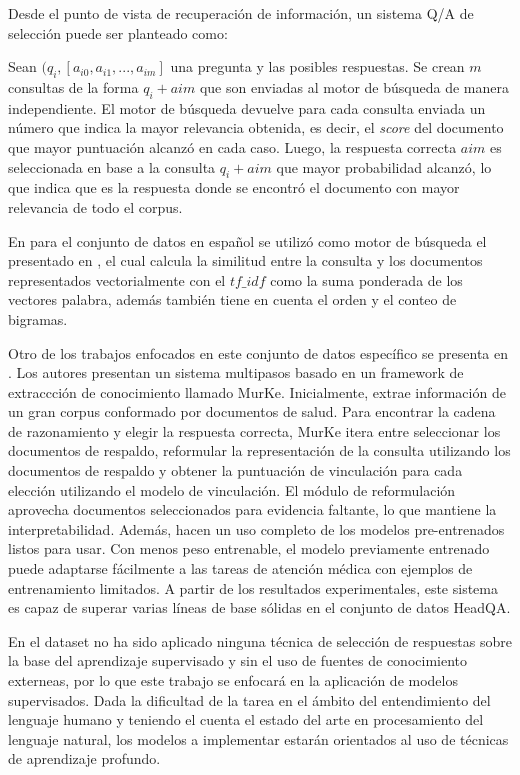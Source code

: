 Desde el punto de vista de recuperación de información, un sistema Q/A de selección puede ser planteado como: 

Sean $(q_{i}, [a_{i0}, a_{i1}, ..., a_{im}]$ una pregunta y las posibles respuestas. Se crean $m$ consultas de la forma $q_{i} + a{i}{m}$ que son enviadas al motor de búsqueda de manera independiente. El motor de búsqueda devuelve para cada consulta enviada un número que indica la mayor relevancia obtenida, es decir, el \textit{score} del documento que mayor puntuación alcanzó en cada caso. Luego, la respuesta correcta $a{i}{m}$ es seleccionada en base a la consulta $q_{i} + a{i}{m}$ que mayor probabilidad alcanzó, lo que indica que es la respuesta donde se encontró el documento con mayor relevancia de todo el corpus. 

En \cite{2019-head-qa} para el conjunto de datos en español se utilizó como motor de búsqueda el presentado en \cite{2017-chen-wikipedia}, el cual calcula la similitud entre la consulta y los documentos representados vectorialmente con el $tf\_idf$ como la suma ponderada de los vectores palabra, además también tiene en cuenta el orden y el conteo de bigramas.

Otro de los trabajos enfocados en este conjunto de datos específico se presenta en \cite{2020-multi-step}. Los autores presentan un sistema multipasos basado en un framework de extraccción de conocimiento llamado MurKe. Inicialmente, extrae información de un gran corpus conformado por documentos de salud. Para encontrar la cadena de razonamiento y elegir la respuesta correcta, MurKe itera entre seleccionar los documentos de respaldo, reformular la representación de la consulta utilizando los documentos de respaldo y obtener la puntuación de vinculación para cada elección utilizando el modelo de vinculación. El módulo de reformulación aprovecha documentos seleccionados para evidencia faltante, lo que mantiene la interpretabilidad. Además, hacen un uso completo de los modelos pre-entrenados listos para usar. Con menos peso entrenable, el modelo previamente entrenado puede adaptarse fácilmente a las tareas de atención médica con ejemplos de entrenamiento limitados. A partir de los resultados experimentales, este sistema es capaz de superar varias líneas de base sólidas en el conjunto de datos HeadQA. 

En el dataset no ha sido aplicado ninguna técnica de selección de respuestas sobre la base del aprendizaje supervisado y sin el uso de fuentes de conocimiento externeas, por lo que este trabajo se enfocará en la aplicación de modelos supervisados. Dada la dificultad de la tarea en el ámbito del entendimiento del lenguaje humano y teniendo el cuenta el estado del arte en procesamiento del lenguaje natural, los modelos a implementar estarán orientados al uso de técnicas de aprendizaje profundo.


